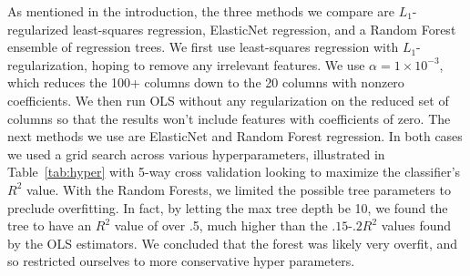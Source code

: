 \documentclass{article}[11pt]
\begin{document}
As mentioned in the introduction, the three methods we compare are $L_1$-regularized least-squares regression, ElasticNet regression, and a Random Forest ensemble of regression trees. We first use least-squares regression with \(L_1\)-regularization, hoping to remove any irrelevant features.
We use $\alpha=1\times10^{-3}$, which reduces
the 100+ columns down to the 20 columns with nonzero
coefficients. We then run OLS without any regularization on the reduced set
of columns so that the results won't include features with coefficients of zero. The next methods we use are ElasticNet and Random Forest regression. In both
cases we used a grid search across various hyperparameters, illustrated in Table~\ref{tab:hyper} with 5-way cross validation looking to
maximize the classifier's \(R^2\) value. With the Random Forests, we
limited the possible tree parameters to preclude overfitting. In fact,
by letting the max tree depth be 10, we found the tree to have an
\(R^2\) value of over .5, much higher than the \(.15\)-\(.2 R^2\) values
found by the OLS estimators. We concluded that the forest was likely
very overfit, and so restricted ourselves to more conservative hyper
parameters. 
\newpage
\end{document}
